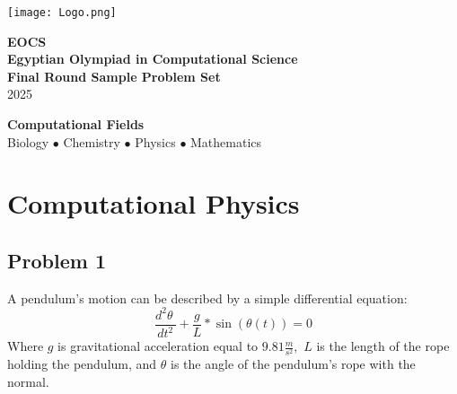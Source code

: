 \documentclass[12pt]{article}
\begin{document}
    
    \begin{titlepage}
    \thispagestyle{empty}
    \begin{center}
        \vspace*{1cm}
        \texttt{[image: Logo.png]}
        \vspace{1cm}
    
        {\fontsize{28}{34}\selectfont\textbf{\textcolor{eocsgold}{EOCS}}} \\
        \vspace{0.8cm}
        {\fontsize{18}{22}\selectfont\textbf{\textcolor{eocsgold}{Egyptian Olympiad in Computational Science}}} \\
        \vspace{1.5cm}
        {\fontsize{22}{26}\selectfont\textbf{Final Round Sample Problem Set}} \\
        \vspace{0.5cm}
        {\large 2025} \\
        \vspace{3cm}
        
        \begin{mdframed}[
          linecolor=eocsgold,
          backgroundcolor=eocslightgold,
          linewidth=1pt,
          innertopmargin=15pt,
          innerbottommargin=15pt,
          innerrightmargin=15pt,
          innerleftmargin=15pt,
          roundcorner=5pt]
          \begin{center}
            \large\textbf{Computational Fields}\\
            \vspace{0.5em}
            Biology \quad $\bullet$ \quad Chemistry \quad $\bullet$ \quad Physics \quad $\bullet$ \quad Mathematics
          \end{center}
        \end{mdframed}
    \end{center}
    \end{titlepage}
    
    \tableofcontents
    \thispagestyle{fancy}
    \clearpage
    
\section{Computational Physics}
\subsection{Problem 1}
A pendulum’s motion can be described by a simple differential equation:
$$\frac{d^2\theta\ }{dt^2}+\frac{g}{L}\ast\sin{\left(\theta\left(t\right)\right)}=0$$
Where $g$ is gravitational acceleration equal to $9.81\frac{m}{s^2},$ $L$ is the length of the rope holding the pendulum, and $ \theta$ is the angle of the pendulum’s rope with the normal. 
\end{document}
